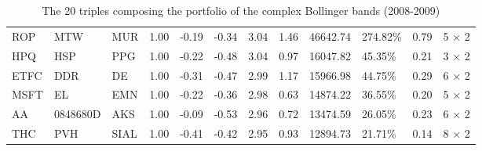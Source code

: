\documentclass[11pt,a4,twosided,singlespacing,titlepagenumber=on]{scrreprt}
\numberwithin{equation}{chapter} %
\theoremstyle{remark}
\begin{document}
\begin{table}[H]
\begin{adjustwidth}{-2.6cm}{}
\begin{tabular}{llllllllllll}
ROP  & MTW  & MUR  & 1.00 & -0.19 & -0.34 & 3.04 & 1.46 & 46642.74 & 274.82\%& 0.79 & 5 $\times$ 2\\
HPQ  & HSP  & PPG  & 1.00 & -0.22 & -0.48 & 3.04 & 0.97 & 16047.82 & 45.35\%& 0.21 & 3 $\times$ 2\\
ETFC  & DDR  & DE  & 1.00 & -0.31 & -0.47 & 2.99 & 1.17 & 15966.98 & 44.75\%& 0.29 & 6 $\times$ 2\\
MSFT  & EL  & EMN  & 1.00 & -0.22 & -0.36 & 2.98 & 0.63 & 14874.22 & 36.55\%& 0.20 & 5 $\times$ 2\\
AA  & 0848680D  & AKS  & 1.00 & -0.09 & -0.53 & 2.96 & 0.72 & 13474.59 & 26.05\%& 0.23 & 6 $\times$ 2\\
THC  & PVH  & SIAL  & 1.00 & -0.41 & -0.42 & 2.95 & 0.93 & 12894.73 & 21.71\%& 0.14 & 8 $\times$ 2\\
\hline
\end{tabular}
\caption{The 20 triples composing the portfolio of the complex Bollinger bands (2008-2009)}
\label{20_selected_triples_complex_bands_sv}
\end{adjustwidth}
\end{table}
\end{document}
